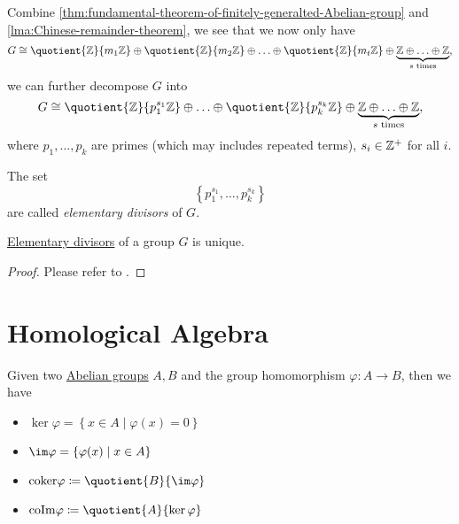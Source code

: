 Combine \autoref{thm:fundamental-theorem-of-finitely-generalted-Abelian-group} and \autoref{lma:Chinese-remainder-theorem}, we see that we now only have
\[
	G\cong \quotient{\mathbb{\MakeUppercase{z}} }{m_1 \mathbb{\MakeUppercase{z}} } \oplus \quotient{\mathbb{\MakeUppercase{z}} }{m_2 \mathbb{\MakeUppercase{z}} } \oplus \ldots \oplus \quotient{\mathbb{\MakeUppercase{z}} }{m_t \mathbb{\MakeUppercase{z}} }  \oplus \underbrace{\mathbb{\MakeUppercase{z}} \oplus \ldots \oplus \mathbb{\MakeUppercase{z}}  }_{s \text{ times}},
\]
we can further decompose \(G\) into
\[
	G\cong \quotient{\mathbb{\MakeUppercase{z}} }{p_1^{s_1}\mathbb{\MakeUppercase{z}} }\oplus \ldots \oplus \quotient{\mathbb{\MakeUppercase{z}} }{p_k^{s_k}\mathbb{\MakeUppercase{z}} }   \oplus \underbrace{\mathbb{\MakeUppercase{z}} \oplus \ldots \oplus \mathbb{\MakeUppercase{z}}  }_{s \text{ times}},
\]
where \(p_1, \ldots , p_{k}  \) are primes (which may includes repeated terms), \(s_{i} \in \mathbb{\MakeUppercase{z}} ^+\) for all \(i\).

\begin{definition}\label{def:elementary-divisors}
	The set
	\[
		\left\{p_1^{s_1}, \ldots , p_{k}^{s_k} \right\}
	\]
	are called \emph{elementary divisors} of \(G\).
\end{definition}

\begin{theorem}\label{thm:uniqueness-of-elementary-divisors}
	\hyperref[def:elementary-divisors]{Elementary divisors} of a group \(G\) is unique.
\end{theorem}
\begin{proof}
	Please refer to \cite{armstrong2013basic}.
\end{proof}

\section{Homological Algebra}\label{sec:homological-algebra}
\begin{prev}
	Given two \hyperref[def:Abelian-group]{Abelian groups} \(A, B\) and the group homomorphism \(\varphi\colon A\to B\), then we have
	\begin{itemize}
		\item \(\ker  \varphi = \left\{x\in A\mid \varphi (x) = 0\right\}\)
		\item \(\im  \varphi = \left\{\varphi (x)\mid x\in A\right\} \)
		\item \(\mathrm{coker}\varphi \coloneqq \quotient{B}{\im  \varphi}\)
		\item \(\mathrm{coIm} \varphi \coloneqq \quotient{A}{\ker  \varphi}\)
	\end{itemize}
\end{prev}

